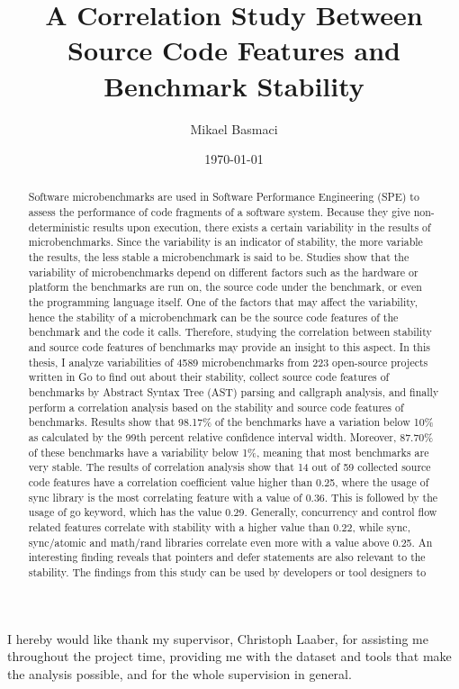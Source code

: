 \documentclass{seal_thesis}
\date{\today}
\title{A Correlation Study Between Source Code Features and Benchmark Stability}
\author{Mikael Basmaci}
\begin{document}
\maketitle

\frontmatter

\begin{acknowledgements}
	I hereby would like thank my supervisor, Christoph Laaber, for assisting me throughout the project time, providing me with the dataset and tools that make the analysis possible, and for the whole supervision in general.
\end{acknowledgements}

\begin{abstract}
		
Software microbenchmarks are used in Software Performance Engineering (SPE) to assess the performance of code fragments of a software system. Because they give non-deterministic results upon execution, there exists a certain variability in the results of microbenchmarks. Since the variability is an indicator of stability, the more variable the results, the less stable a microbenchmark is said to be. Studies show that the variability of microbenchmarks depend on different factors such as the hardware or platform the benchmarks are run on, the source code under the benchmark, or even the programming language itself. One of the factors that may affect the variability, hence the stability of a microbenchmark can be the source code features of the benchmark and the code it calls. Therefore, studying the correlation between stability and source code features of benchmarks may provide an insight to this aspect. In this thesis, I analyze variabilities of 4589 microbenchmarks from 223 open-source projects written in Go to find out about their stability, collect source code features of benchmarks by Abstract Syntax Tree (AST) parsing and callgraph analysis, and finally perform a correlation analysis based on the stability and source code features of benchmarks. Results show that 98.17\% of the benchmarks have a variation below 10\% as calculated by the 99th percent relative confidence interval width. Moreover, 87.70\% of these benchmarks have a variability below 1\%, meaning that most benchmarks are very stable. The results of correlation analysis show that 14 out of 59 collected source code features have a correlation coefficient value higher than 0.25, where the usage of sync library is the most correlating feature with a value of 0.36. This is followed by the usage of go keyword, which has the value 0.29. Generally, concurrency and control flow related features correlate with stability with a higher value than 0.22, while sync, sync/atomic and math/rand libraries correlate even more with a value above 0.25. An interesting finding reveals that pointers and defer statements are also relevant to the stability. The findings from this study can be used by developers or tool designers to 


\end{abstract}
\end{document}
